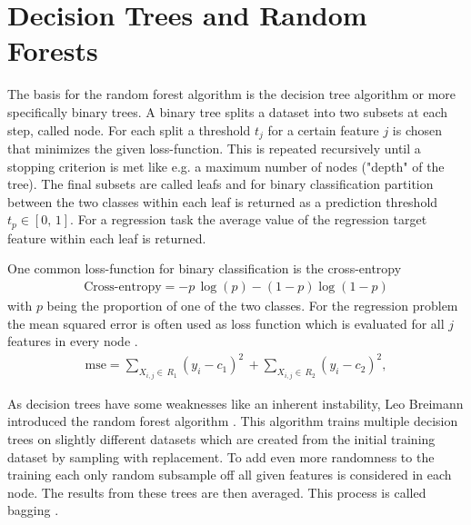 \section{Decision Trees and Random Forests}
The basis for the random forest algorithm is the decision tree algorithm \cite{breiman1984classification} or more specifically binary trees.
A binary tree splits a dataset into two subsets at each step, called node.
For each split a threshold $t_j$ for a certain feature $j$ is chosen that minimizes the given loss-function.
This is repeated recursively until a stopping criterion is met like e.g. a maximum number of nodes ("depth" of the tree). 
The final subsets are called leafs and for binary classification partition between the two classes within each leaf is returned as a prediction threshold
$t_p \in [0,\, 1]$.
For a regression task the average value of the regression target feature within each leaf is returned.

One common loss-function for binary classification is the cross-entropy
\begin{align}
    \text{Cross-entropy} = - p\, \log(p) - (1 - p) \log(1-p)
\end{align}
with $p$ being the proportion of one of the two classes.
For the regression problem the mean squared error is often used as loss function which is evaluated for all $j$ features in every node \cite{hastie2009elements}.
\begin{align}
    \text{mse} = \sum_{X_{i,j} \in\, R_1} (y_i - c_1)^2\, + \sum_{X_{i,j} \in\, R_2} (y_i - c_2)^2,
\end{align}

As decision trees have some weaknesses like an inherent instability, Leo Breimann introduced the random forest algorithm \cite{breiman2001random}. 
This algorithm trains multiple decision trees on slightly different datasets which are created from the initial training dataset by sampling with replacement.
To add even more randomness to the training each only random subsample off all given features is considered in each node. 
The results from these trees are then averaged.
This process is called bagging \cite{breiman1996bagging}.



